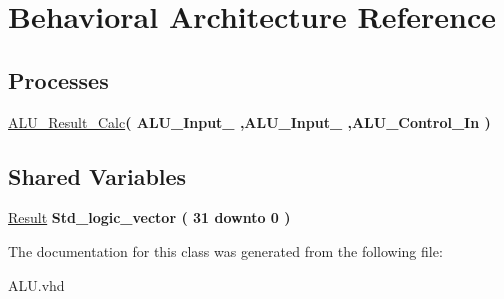 \hypertarget{class_a_l_u_1_1_behavioral}{\section{\-Behavioral \-Architecture \-Reference}
\label{class_a_l_u_1_1_behavioral}
}
\*
\*
\subsection*{\-Processes}
 \begin{DoxyCompactItemize}
\item 
\hypertarget{class_a_l_u_1_1_behavioral_a9d398c4f01ad1a21234856b1403845fc}{\hyperlink{class_a_l_u_1_1_behavioral_a9d398c4f01ad1a21234856b1403845fc}{\-A\-L\-U\-\_\-\-Result\-\_\-\-Calc}{\bfseries  ( {\bfseries \-A\-L\-U\-\_\-\-Input\-\_  ,\-A\-L\-U\-\_\-\-Input\-\_ ,\-A\-L\-U\-\_\-\-Control\-\_\-\-In } )}}\label{class_a_l_u_1_1_behavioral_a9d398c4f01ad1a21234856b1403845fc}

\end{DoxyCompactItemize}
\subsection*{\-Shared \-Variables}
 \begin{DoxyCompactItemize}
\item 
\hypertarget{class_a_l_u_1_1_behavioral_afc4b6c182f9d7ec900d031c30ae7fd43}{\hyperlink{class_a_l_u_1_1_behavioral_afc4b6c182f9d7ec900d031c30ae7fd43}{\-Result} {\bfseries \-Std\-\_\-logic\-\_\-vector (   31    downto    0  ) } }\label{class_a_l_u_1_1_behavioral_afc4b6c182f9d7ec900d031c30ae7fd43}

\end{DoxyCompactItemize}


\-The documentation for this class was generated from the following file\-:\begin{DoxyCompactItemize}
\item 
\-A\-L\-U.\-vhd\end{DoxyCompactItemize}
